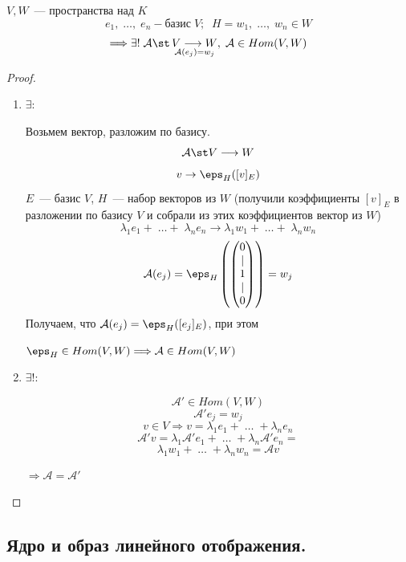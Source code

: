 \begin{Proposition}{}{}
    $V, W$~--- пространства над $K$
    \[ e_1, \; \ldots, \; e_n - \text{базис} \; V; \;\; H = w_1, \; \ldots, \; w_n \in W \]
     \[ 
     \Longrightarrow \exists ! \; \mathcal{A} \st \mathop{V \longrightarrow W}_{\mathcal{A}(e_j) = w_j}, \;
     \mathcal{A} \in Hom(V, W)
     \]

\end{Proposition}

\begin{proof}
    \begin{enumerate}
        \item $\exists$:
        
        Возьмем вектор, разложим по базису.
        \[ \mathcal{A} \st V \longrightarrow W \]
        \[
        v \rightarrow \eps_H([v]_E)
        \]
        $E$~--- базис $V$, $H$~--- набор векторов из $W$ (получили коэффициенты $[v]_E$ в разложении по базису $V$
         и собрали из этих коэффициентов вектор из $W$)
        \[
        \lambda_1e_1 + \; \ldots + \; \lambda_n e_n \longrightarrow \lambda_1 w_1 + \; \ldots + \; \lambda_n w_n
        \]
        \[ 
        \mathcal{A}(e_j) = \eps_H \left( \begin{pmatrix} 0 \\ | \\  1 \\ | \\ 0 \end{pmatrix} \right) = w_j
        \]
        Получаем, что $\mathcal{A}(e_j) = \eps_H([e_j]_E)$, при этом 
        
        $\eps_H \in Hom(V, W) \Longrightarrow \mathcal{A} \in Hom(V, W)$

        \item $\exists \textbf{!}$:
        
        \[
        \mathcal{A}' \in Hom(V, W)
        \]
        \[
        \mathcal{A}' e_j = w_j
        \]
        \[
        v \in V \Rightarrow v = \lambda_1 e_1 + \; \ldots \; + \lambda_n e_n
        \]
        \[
        \mathcal{A}' v = \lambda_1 \mathcal{A}' e_1 + \; \ldots \; + \lambda_n \mathcal{A}' e_n =
        \]
        \[ \lambda_1 w_1 + \; \ldots \; + \lambda_n w_n = \mathcal{A} v \]

        $\Rightarrow \mathcal{A} = \mathcal{A}'$
    \end{enumerate}
\end{proof}

\subsection{Ядро и образ линейного отображения.}

